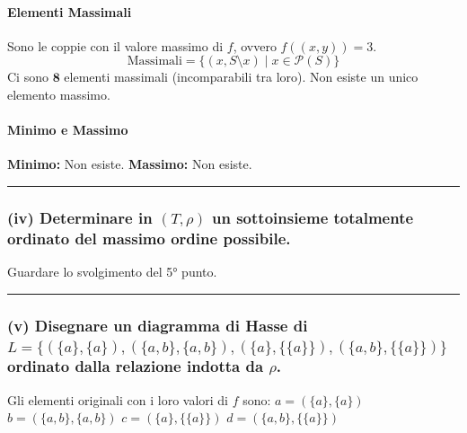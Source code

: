 \paragraph*{Elementi Massimali}
Sono le coppie con il valore massimo di $f$, ovvero $f((x, y)) = 3$.
$$ \text{Massimali} = \{(x, S \setminus x) \mid x \in \mathcal{P}(S)\} $$
Ci sono $\mathbf{8}$ elementi massimali (incomparabili tra loro). Non esiste un unico elemento massimo.

\paragraph*{Minimo e Massimo}
\textbf{Minimo:} Non esiste. \textbf{Massimo:} Non esiste.

\vspace{0.3cm}
\hrule
\vspace{0.3cm}

\subsubsection*{(iv) Determinare in $(T, \rho)$ un sottoinsieme totalmente ordinato del massimo ordine possibile.}

Guardare lo svolgimento del 5° punto.

\vspace{0.3cm}
\hrule
\vspace{0.3cm}

\subsubsection*{(v) Disegnare un diagramma di Hasse di $L = \{(\{a\}, \{a\}), (\{a, b\}, \{a, b\}), (\{a\}, \{\{a\}\}), (\{a, b\}, \{\{a\}\})\}$ ordinato dalla relazione indotta da $\rho$.}

Gli elementi originali con i loro valori di $f$ sono:
$a = (\{a\}, \{a\})$
$b = (\{a, b\}, \{a, b\})$
$c = (\{a\}, \{\{a\}\})$
$d = (\{a, b\}, \{\{a\}\})$

\begin{figure}[h]
    \centering
\end{figure}

